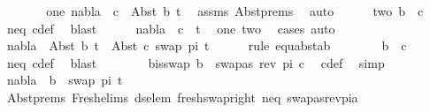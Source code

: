 \begin{isabellebody}
\ \ \ \ \isamarkupfalse%
\ \isamarkupfalse%
\ one{\isacharcolon}{\kern0pt}\ {\isachardoublequoteopen}nabla\ {\isasymturnstile}\ c\ {\isasymsharp}\ Abst\ b\ t{\isacharprime}{\kern0pt}{\isachardoublequoteclose}\ \isamarkupfalse%
\ assms\ Abst{\isachardot}{\kern0pt}prems\ \isamarkupfalse%
\ auto\isanewline
\ \ \ \ \isamarkupfalse%
\ two{\isacharcolon}{\kern0pt}\ {\isachardoublequoteopen}b\ {\isasymnoteq}\ c{\isachardoublequoteclose}\ \isamarkupfalse%
\ neq\ c{\isacharunderscore}{\kern0pt}def\ \isamarkupfalse%
\ blast\isanewline
\ \ \ \ \isamarkupfalse%
\ {\isachardoublequoteopen}nabla\ {\isasymturnstile}\ c\ {\isasymsharp}\ t{\isacharprime}{\kern0pt}{\isachardoublequoteclose}\ \isamarkupfalse%
\ one\ two\ \isamarkupfalse%
\ cases\ auto\isanewline
\ \ \ \ \isamarkupfalse%
\ {\isachardoublequoteopen}nabla\ {\isasymturnstile}\ Abst\ b\ t{\isacharprime}{\kern0pt}\ {\isasymapprox}\ Abst\ c\ {\isacharparenleft}{\kern0pt}swap\ pi\ t{\isacharprime}{\kern0pt}{\isacharparenright}{\kern0pt}{\isachardoublequoteclose}\ \isanewline
\ \ \ \ \isamarkupfalse%
{\isacharparenleft}{\kern0pt}rule\ equ{\isacharunderscore}{\kern0pt}abst{\isacharunderscore}{\kern0pt}ab{\isacharparenright}{\kern0pt}\isanewline
\ \ \ \ \ \ \isamarkupfalse%
\ {\isachardoublequoteopen}b\ {\isasymnoteq}\ c{\isachardoublequoteclose}\ \isamarkupfalse%
\ neq\ c{\isacharunderscore}{\kern0pt}def\ \isamarkupfalse%
\ blast\isanewline
\ \ \ \ \ \ \isamarkupfalse%
\ b{\isacharunderscore}{\kern0pt}is{\isacharunderscore}{\kern0pt}swap{\isacharcolon}{\kern0pt}\ {\isachardoublequoteopen}b\ {\isacharequal}{\kern0pt}\ swapas\ {\isacharparenleft}{\kern0pt}rev\ pi{\isacharparenright}{\kern0pt}\ c{\isachardoublequoteclose}\ \isamarkupfalse%
\ c{\isacharunderscore}{\kern0pt}def\ \isamarkupfalse%
\ simp\isanewline
\ \ \ \ \ \ \isamarkupfalse%
\ {\isachardoublequoteopen}nabla\ {\isasymturnstile}\ b\ {\isasymsharp}\ swap\ pi\ t{\isacharprime}{\kern0pt}{\isachardoublequoteclose}\ \isanewline
\ \ \ \ \ \ \ \ \isamarkupfalse%
\ Abst{\isachardot}{\kern0pt}prems\ Fresh{\isacharunderscore}{\kern0pt}elims{\isacharparenleft}{\kern0pt}{}{\isacharparenright}{\kern0pt}\ ds{\isacharunderscore}{\kern0pt}elem\ fresh{\isacharunderscore}{\kern0pt}swap{\isacharunderscore}{\kern0pt}right\ neq\ swapas{\isacharunderscore}{\kern0pt}rev{\isacharunderscore}{\kern0pt}pi{\isacharunderscore}{\kern0pt}a\ \isamarkupfalse%

\end{isabellebody}
